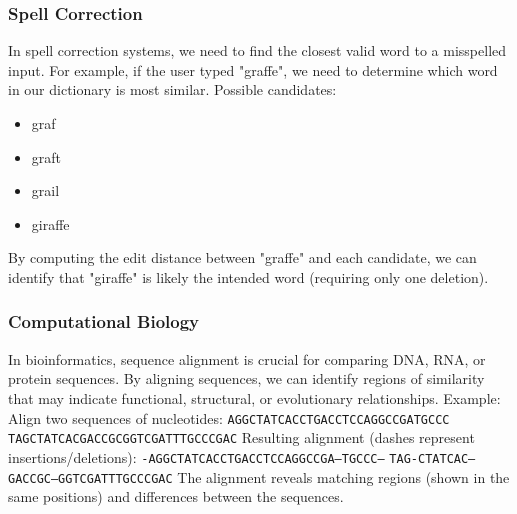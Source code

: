 \documentclass[a4paper]{article}
\theoremstyle{definition}
\begin{document}
\subsubsection{Spell Correction}
In spell correction systems, we need to find the closest valid word to a misspelled input. For 
example, if the user typed "graffe", we need to determine which word in our dictionary is most similar.
\vspace{1em}
\noindent
\newline
Possible candidates:
\begin{itemize}
  \item graf 
  \item graft 
  \item grail 
  \item giraffe
\end{itemize}
By computing the edit distance between "graffe" and each candidate, we can identify that "giraffe" is likely the intended 
word (requiring only one deletion).
\subsubsection{Computational Biology}
In bioinformatics, sequence alignment is crucial for comparing DNA, RNA, or protein sequences.
By aligning sequences, we can identify regions of similarity that may indicate functional, structural, or evolutionary relationships.
\vspace{1em}
\noindent
\newline
Example: Align two sequences of nucleotides:
\vspace{1em}
\noindent
\newline
\texttt{AGGCTATCACCTGACCTCCAGGCCGATGCCC}
\vspace{1em}
\noindent
\newline
\texttt{TAGCTATCACGACCGCGGTCGATTTGCCCGAC}
\vspace{1em}
\noindent
\newline
Resulting alignment (dashes represent insertions/deletions):
\vspace{1em}
\noindent
\newline
\texttt{-AGGCTATCACCTGACCTCCAGGCCGA--TGCCC---}
\newline
\texttt{TAG-CTATCAC--GACCGC--GGTCGATTTGCCCGAC}
\vspace{1em}
\noindent
\newline
The alignment reveals matching regions (shown in the same positions) and differences between the sequences.
\end{document}
